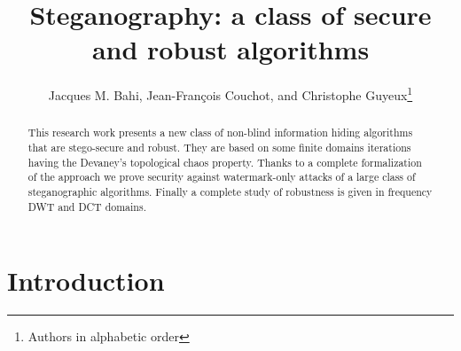 \documentclass{comjnl}
\begin{document}
\title[Steganography: a class of secure and robust algorithms]{Steganography: a class of secure and robust algorithms}

\author{Jacques M. Bahi, Jean-Fran\c{c}ois Couchot, and Christophe Guyeux\thanks{Authors in alphabetic order}}
 







\newcommand{\Nats}[0]{\ensuremath{\mathbb{N}}}
\newcommand{\Z}[0]{\ensuremath{\mathbb{Z}}}
\newcommand{\R}[0]{\ensuremath{\mathbb{R}}}
\newcommand{\Bool}[0]{\ensuremath{\mathds{B}}}
\newcommand{\StratSet}[0]{\ensuremath{\mathbb{S}}}



\begin{abstract}
This research work presents a new class of non-blind information hiding
algorithms that are stego-secure and robust.
They are based on some finite domains iterations having the Devaney's 
topological chaos property.
Thanks to a complete formalization of the approach we prove   
security against watermark-only attacks
of a large class of steganographic algorithms.
Finally a complete study of robustness is given in frequency DWT and DCT domains.
\end{abstract}

\maketitle 



\maketitle




\section{Introduction}\label{sec:intro}
\end{document}

